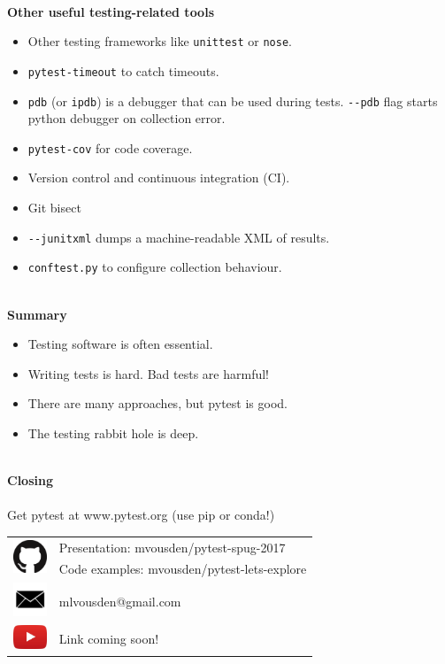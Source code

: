 \documentclass[12pt]{article}
\newcommand{\slidetitle}[1]{~\\[-0.5ex]{\Large\bf{\color{bold}#1}}\\}
\begin{document}
\slidetitle{Other useful testing-related tools}
\begin{itemize}[itemsep=0cm]
\item Other testing frameworks like \verb|unittest| or \verb|nose|.
\item \verb|pytest-timeout| to catch timeouts.
\item \verb|pdb| (or \verb|ipdb|) is a debugger that can be used during
    tests. \verb|--pdb| flag starts python debugger on collection error.
\item \verb|pytest-cov| for code coverage.
\item Version control and continuous integration (CI).
\item Git bisect
\item \verb|--junitxml| dumps a machine-readable XML of results.
\item \verb|conftest.py| to configure collection behaviour.
\end{itemize}
\clearpage

\slidetitle{Summary}
\begin{itemize}
\item Testing software is often essential.
\item Writing tests is hard. Bad tests are harmful!
\item There are many approaches, but pytest is good.
\item The testing rabbit hole is deep.
\end{itemize}
\clearpage

\slidetitle{Closing}\\[0.5cm]
Get pytest at www.pytest.org (use pip or conda!)
\vfill
\renewcommand{\arraystretch}{1.2}
\begin{tabular}{ll}
\multirow{2}{*}{\includegraphics[width=1cm]{github.png}} &
Presentation: mvousden/pytest-spug-2017 \\
& Code examples: mvousden/pytest-lets-explore \\
\multirow{2}{*}{\includegraphics[width=1cm]{email.png}} &
\multirow{2}{*}{mlvousden@gmail.com} \\ \\
\multirow{2}{*}{\includegraphics[width=1cm]{youtube.png}} &
\multirow{2}{*}{Link coming soon!} \\ \\
\end{tabular}
\vfill
\clearpage
\end{document}
